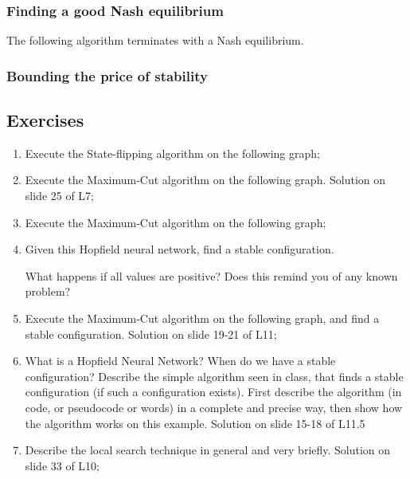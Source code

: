 \subsubsection{Finding a good Nash equilibrium}
The following algorithm terminates with a Nash equilibrium.


\subsubsection{Bounding the price of stability}

\newpage
\subsection{Exercises}
\begin{enumerate}
    \item Execute the State-flipping algorithm on the following graph;


    \item Execute the Maximum-Cut algorithm on the following graph. Solution on slide 25 of L7;


    \item Execute the Maximum-Cut algorithm on the following graph;


    \item Given this Hopfield neural network, find a stable configuration.


    What happens if all values are positive? Does this remind you of any known problem?

    \item Execute the Maximum-Cut algorithm on the following graph, and find a stable configuration. Solution on slide 19-21 of L11;


    \item What is a Hopfield Neural Network? When do we have a stable configuration? Describe the simple algorithm seen in class, that finds a stable configuration (if such a configuration exists). First describe the algorithm (in code, or pseudocode or words) in a complete and precise way, then show how the algorithm works on this example. Solution on slide 15-18 of L11.5


    \item Describe the local search technique in general and very briefly. Solution on slide 33 of L10;
    
\end{enumerate}